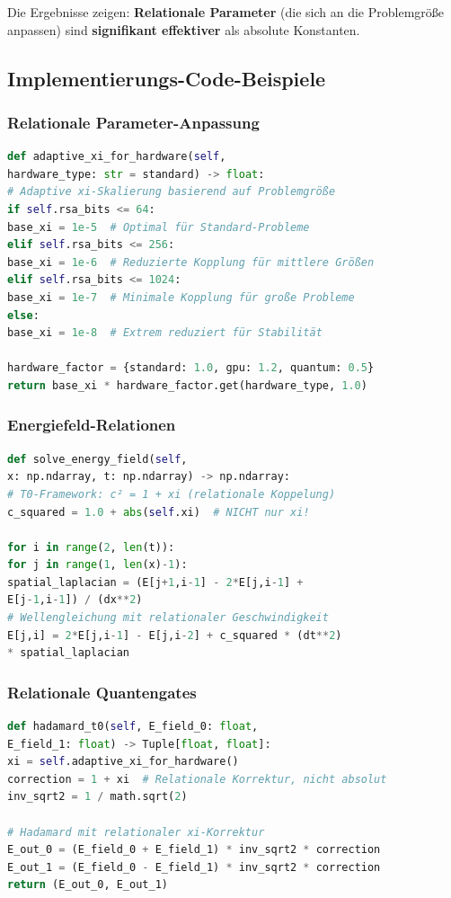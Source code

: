 	Die Ergebnisse zeigen: \textbf{Relationale Parameter} (die sich an die Problemgröße anpassen) sind \textbf{signifikant effektiver} als absolute Konstanten.
	
	\subsection{Implementierungs-Code-Beispiele}
	
	\subsubsection{Relationale Parameter-Anpassung}
	\begin{lstlisting}[language=Python, breaklines=true, frame=none, basicstyle=\scriptsize\ttfamily]
def adaptive_xi_for_hardware(self,
hardware_type: str = standard) -> float:
# Adaptive xi-Skalierung basierend auf Problemgröße
if self.rsa_bits <= 64:
base_xi = 1e-5  # Optimal für Standard-Probleme
elif self.rsa_bits <= 256:
base_xi = 1e-6  # Reduzierte Kopplung für mittlere Größen
elif self.rsa_bits <= 1024:
base_xi = 1e-7  # Minimale Kopplung für große Probleme
else:
base_xi = 1e-8  # Extrem reduziert für Stabilität

hardware_factor = {standard: 1.0, gpu: 1.2, quantum: 0.5}
return base_xi * hardware_factor.get(hardware_type, 1.0)
\end{lstlisting}
	
	\subsubsection{Energiefeld-Relationen}
	\begin{lstlisting}[language=Python, breaklines=true, frame=none, basicstyle=\scriptsize\ttfamily]
def solve_energy_field(self,
x: np.ndarray, t: np.ndarray) -> np.ndarray:
# T0-Framework: c² = 1 + xi (relationale Koppelung)
c_squared = 1.0 + abs(self.xi)  # NICHT nur xi!

for i in range(2, len(t)):
for j in range(1, len(x)-1):
spatial_laplacian = (E[j+1,i-1] - 2*E[j,i-1] + 
E[j-1,i-1]) / (dx**2)
# Wellengleichung mit relationaler Geschwindigkeit
E[j,i] = 2*E[j,i-1] - E[j,i-2] + c_squared * (dt**2) 
* spatial_laplacian
\end{lstlisting}
	
	\subsubsection{Relationale Quantengates}
	\begin{lstlisting}[language=Python, breaklines=true, frame=none, basicstyle=\scriptsize\ttfamily]
def hadamard_t0(self, E_field_0: float,
E_field_1: float) -> Tuple[float, float]:
xi = self.adaptive_xi_for_hardware()
correction = 1 + xi  # Relationale Korrektur, nicht absolut
inv_sqrt2 = 1 / math.sqrt(2)

# Hadamard mit relationaler xi-Korrektur
E_out_0 = (E_field_0 + E_field_1) * inv_sqrt2 * correction
E_out_1 = (E_field_0 - E_field_1) * inv_sqrt2 * correction
return (E_out_0, E_out_1)
\end{lstlisting}
	
